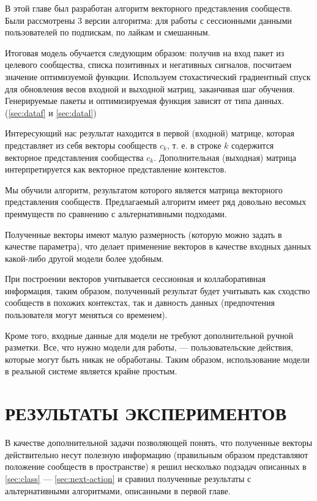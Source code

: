 \documentclass[times,specification,annotation]{itmo-student-thesis}
\begin{document}
\chapterconclusion

В этой главе был разработан алгоритм векторного представления сообществ. Были рассмотрены 3 версии алгоритма: для работы с сессионными данными пользователей по подпискам, по лайкам и смешанным.

Итоговая модель обучается следующим образом: получив на вход пакет из
целевого сообщества, списка позитивных и негативных сигналов, посчитаем
значение оптимизуемой функции. Используем стохастический градиентный спуск для обновления весов входной и выходной матриц, заканчивая шаг обучения. Генерируемые пакеты и оптимизируемая функция зависят от типа данных. (\ref{sec:dataf} и \ref{sec:datal})

Интересующий нас результат находится в первой (входной) матрице, которая
представляет из себя векторы сообществ $c_k$, т. е. в строке $k$ содержится векторное
представления сообщества $c_k$. Дополнительная (выходная) матрица
интерпретируется как векторное представление контекстов.

Мы обучили алгоритм, результатом которого является матрица векторного
представления сообществ. Предлагаемый алгоритм имеет ряд довольно весомых
преимуществ по сравнению с альтернативными подходами. 

Полученные векторы
имеют малую размерность (которую можно задать в качестве параметра), что
делает применение векторов в качестве входных данных какой-либо другой
модели более удобным. 

При построении векторов учитывается сессионная и
коллаборативная информация, таким образом, полученный результат будет
учитывать как сходство сообществ в похожих контекстах, так и давность данных
(предпочтения пользователя могут меняться со временем). 

Кроме того, входные данные для модели не требуют дополнительной ручной разметки. Все, что нужно модели для работы, --- пользовательские действия, которые могут быть никак не обработаны. Таким образом, использование модели в реальной системе является крайне простым.

\chapter{РЕЗУЛЬТАТЫ ЭКСПЕРИМЕНТОВ}

В качестве дополнительной задачи позволяющей понять, что полученные
векторы действительно несут полезную информацию (правильным образом
представляют положение сообществ в пространстве) я решил несколько подзадач
описанных в \ref{sec:class} --- \ref{sec:next-action} и сравнил полученные результаты с альтернативными
алгоритмами, описанными в первой главе.
\end{document}
